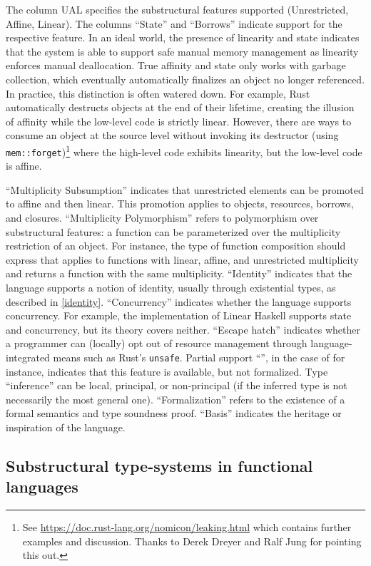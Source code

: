 The column UAL
specifies the substructural features supported (Unrestricted, Affine,
Linear). The columns ``State'' and ``Borrows'' indicate support for the respective
feature. In an ideal world, the presence of linearity and state
indicates that the system is able to support safe manual memory
management as linearity enforces manual deallocation. True affinity
and state only works with garbage collection, which eventually
automatically finalizes an object no longer referenced. In practice, this
distinction is often watered down. For example, Rust automatically
destructs objects at the end of their lifetime, creating the
illusion of affinity while the low-level code is strictly linear.
However, there are ways to consume an object at the source
level without invoking its destructor (using
\lstinline/mem::forget/)\footnote{See
  \url{https://doc.rust-lang.org/nomicon/leaking.html} which contains
  further examples and discussion. Thanks to
  Derek Dreyer and Ralf Jung for pointing this out.}
where the high-level code exhibits linearity, but the low-level code
is affine.

``Multiplicity Subsumption'' indicates that unrestricted elements 
can be promoted to affine and then linear. This promotion applies to
objects, resources, borrows, and closures. ``Multiplicity Polymorphism'' refers to polymorphism over
substructural features: a function can be parameterized over the multiplicity
restriction of an object. For instance, the type of function
composition should express that applies to functions with linear,
affine, and unrestricted multiplicity and returns a function with the
same multiplicity. 
``Identity'' indicates that the language supports a notion
of identity, usually through existential types, as described in
\cref{identity}.
``Concurrency'' indicates whether the language supports
concurrency. For example, the implementation of Linear Haskell
supports state and concurrency, but its theory covers neither.
``Escape hatch'' indicates whether a programmer can (locally) opt out of
resource management through language-integrated means such
as Rust's \texttt{unsafe}. Partial support ``\M'', in the case of \lang
for instance, indicates that this feature is available, but not formalized.
Type ``inference''  can be local, principal, or non-principal (if the
inferred type is not necessarily the most general one). ``Formalization''
refers to the existence of a formal semantics and type soundness
proof. ``Basis'' indicates the heritage or inspiration of the language.

\subsection{Substructural type-systems in functional languages}

